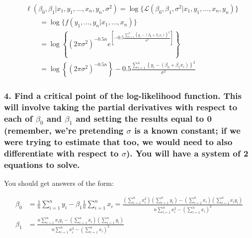 \documentclass[]{article}
\begin{document}
\begin{align*}
&\ell(\beta_0, \beta_1 | x_1, y_1, \ldots, x_n, y_n, \sigma^2) = \log\{ \mathcal{L}(\beta_0, \beta_1, \sigma^2 | x_1, y_1, \ldots, x_n, y_n) \} \\
&\qquad = \log\{ f(y_1, \ldots, y_n | x_1, \ldots, x_n) \} \\
&\qquad = \log\left\{  (2 \pi \sigma^2)^{-0.5n} e^{\left[ -0.5 \frac{\sum_{i = 1}^n\left\{y_i - (\beta_0 + \beta_1 x_i)\right\}^2}{\sigma^2} \right]} \right\} \\
&\qquad = \log\left\{  (2 \pi \sigma^2)^{-0.5n}\right\} -0.5 \frac{\sum_{i = 1}^n\left\{y_i - (\beta_0 + \beta_1 x_i)\right\}^2}{\sigma^2}
\end{align*}

\subsubsection{\texorpdfstring{4. Find a critical point of the
log-likelihood function. This will involve taking the partial
derivatives with respect to each of \(\beta_0\) and \(\beta_1\) and
setting the results equal to 0 (remember, we're pretending \(\sigma\) is
a known constant; if we were trying to estimate that too, we would need
to also differentiate with respect to \(\sigma\)). You will have a
system of 2 equations to
solve.}{4. Find a critical point of the log-likelihood function. This will involve taking the partial derivatives with respect to each of \textbackslash{}beta\_0 and \textbackslash{}beta\_1 and setting the results equal to 0 (remember, we're pretending \textbackslash{}sigma is a known constant; if we were trying to estimate that too, we would need to also differentiate with respect to \textbackslash{}sigma). You will have a system of 2 equations to solve.}}\label{find-a-critical-point-of-the-log-likelihood-function.-this-will-involve-taking-the-partial-derivatives-with-respect-to-each-of-beta_0-and-beta_1-and-setting-the-results-equal-to-0-remember-were-pretending-sigma-is-a-known-constant-if-we-were-trying-to-estimate-that-too-we-would-need-to-also-differentiate-with-respect-to-sigma.-you-will-have-a-system-of-2-equations-to-solve.}

You should get answers of the form:

\begin{align*}
\beta_0 &= \frac{1}{n}\sum_{i = 1}^n y_i - \beta_1 \frac{1}{n} \sum_{i = 1}^n x_i = \frac{\left(\sum_{i = 1}^n x_i^2\right) \left(\sum_{i = 1}^n y_i\right) - \left(\sum_{i = 1}^n x_i\right) \left(\sum_{i = 1}^n x_i y_i \right)}{n \sum_{i = 1}^n x_i^2 - \left(\sum_{i = 1}^n x_i\right)^2} \\
\beta_1 &= \frac{n \sum_{i = 1}^n x_i y_i - \left(\sum_{i = 1}^n x_i\right) \left(\sum_{i = 1}^n y_i\right)}{n \sum_{i = 1}^n x_i^2 - \left(\sum_{i = 1}^n x_i\right)^2}
\end{align*}
\end{document}
